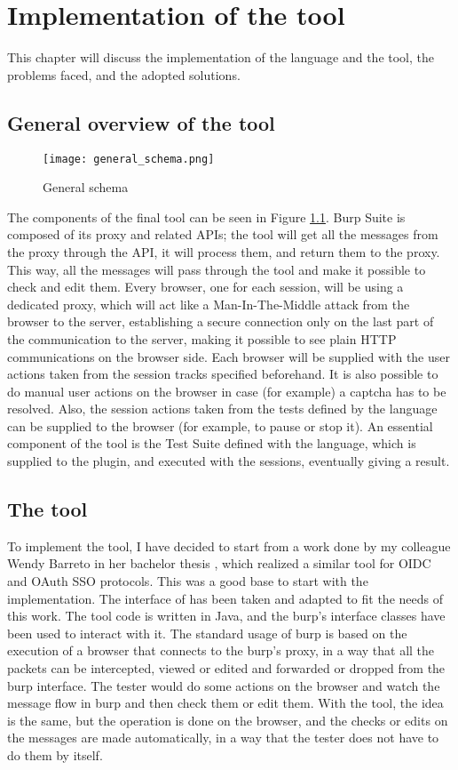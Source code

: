 \chapter{Implementation of the tool}
\label{chap:Implementation}
This chapter will discuss the implementation of the language and the tool, the problems faced, and the adopted solutions.

\section{General overview of the tool}
\begin{figure}
    \texttt{[image: general\_schema.png]}
    \caption{General schema}
    \label{fig:general_schema}
\end{figure}

The components of the final tool can be seen in Figure \ref{fig:general_schema}. Burp Suite is composed of its proxy and related APIs; the tool will get all the messages from the proxy through the API, it will process them, and return them to the proxy. This way, all the messages will pass through the tool and make it possible to check and edit them.
Every browser, one for each session, will be using a dedicated proxy, which will act like a Man-In-The-Middle attack from the browser to the server, establishing a secure connection only on the last part of the communication to the server, making it possible to see plain HTTP communications on the browser side. Each browser will be supplied with the user actions taken from the session tracks specified beforehand. It is also possible to do manual user actions on the browser in case (for example) a captcha has to be resolved. Also, the session actions taken from the tests defined by the language can be supplied to the browser (for example, to pause or stop it). An essential component of the tool is the Test Suite defined with the language, which is supplied to the plugin, and executed with the sessions, eventually giving a result.

\section{The tool}
To implement the tool, I have decided to start from a work done by my colleague Wendy Barreto in her bachelor thesis \cite{wendy_barreto}, which realized a similar tool for \gls{OIDC} and \gls{OAuth} SSO protocols. This was a good base to start with the implementation. The interface of \cite{wendy_barreto} has been taken and adapted to fit the needs of this work. The tool code is written in Java, and the \Gls{burp}'s interface classes have been used to interact with it.
The standard usage of \Gls{burp} is based on the execution of a browser that connects to the \Gls{burp}'s proxy, in a way that all the packets can be intercepted, viewed or edited and forwarded or dropped from the \Gls{burp} interface. The tester would do some actions on the browser and watch the message flow in \Gls{burp} and then check them or edit them. With the tool, the idea is the same, but the operation is done on the browser, and the checks or edits on the messages are made automatically, in a way that the tester does not have to do them by itself.

